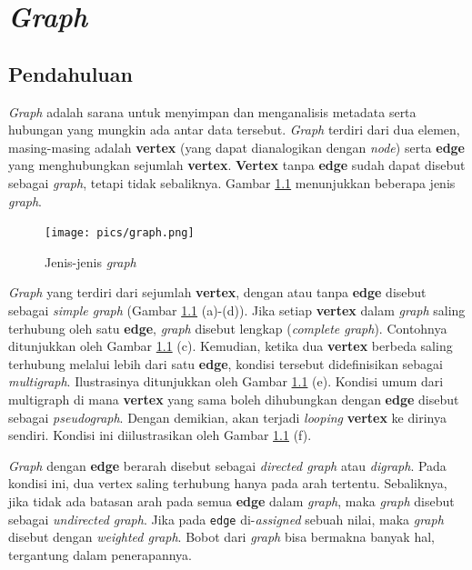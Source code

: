 \chapter{\textit{Graph}}
\section{Pendahuluan}
\textit{Graph} adalah sarana untuk menyimpan dan menganalisis metadata serta hubungan yang mungkin ada antar data tersebut. \textit{Graph} terdiri dari dua elemen, masing-masing adalah \textbf{vertex} (yang dapat dianalogikan dengan \textit{node}) serta \textbf{edge} yang menghubungkan sejumlah \textbf{vertex}. \textbf{Vertex} tanpa \textbf{edge} sudah dapat disebut sebagai \textit{graph}, tetapi tidak sebaliknya. Gambar \ref{fig:jenisgraph} menunjukkan beberapa jenis \textit{graph}.

\begin{figure}[H]
\centering
\texttt{[image: pics/graph.png]}
\caption[Jenis-jenis \textit{graph}]{Jenis-jenis \textit{graph}\cite{adam2001data}}
\label{fig:jenisgraph}
\end{figure}

\textit{Graph} yang terdiri dari sejumlah \textbf{vertex}, dengan atau tanpa \textbf{edge} disebut sebagai \textit{simple graph} (Gambar \ref{fig:jenisgraph} (a)-(d)). Jika setiap \textbf{vertex} dalam \textit{graph} saling terhubung oleh satu \textbf{edge}, \textit{graph} disebut lengkap (\textit{complete graph}). Contohnya ditunjukkan oleh Gambar \ref{fig:jenisgraph} (c). Kemudian, ketika dua \textbf{vertex} berbeda saling terhubung melalui lebih dari satu \textbf{edge}, kondisi tersebut didefinisikan sebagai \textit{multigraph}. Ilustrasinya ditunjukkan oleh Gambar \ref{fig:jenisgraph} (e). Kondisi umum dari multigraph di mana \textbf{vertex} yang sama boleh dihubungkan dengan \textbf{edge} disebut sebagai \textit{pseudograph}. Dengan demikian, akan terjadi \textit{looping} \textbf{vertex} ke dirinya sendiri. Kondisi ini diilustrasikan oleh Gambar \ref{fig:jenisgraph} (f).

\textit{Graph} dengan \textbf{edge} berarah disebut sebagai \textit{directed graph} atau \textit{digraph}. Pada kondisi ini, dua vertex saling terhubung hanya pada arah tertentu. Sebaliknya, jika tidak ada batasan arah pada semua \textbf{edge} dalam \textit{graph}, maka \textit{graph} disebut sebagai \textit{undirected graph}. Jika pada \texttt{edge} di-\textit{assigned} sebuah nilai, maka \textit{graph} disebut dengan \textit{weighted graph}. Bobot dari \textit{graph} bisa bermakna banyak hal, tergantung dalam penerapannya. 

